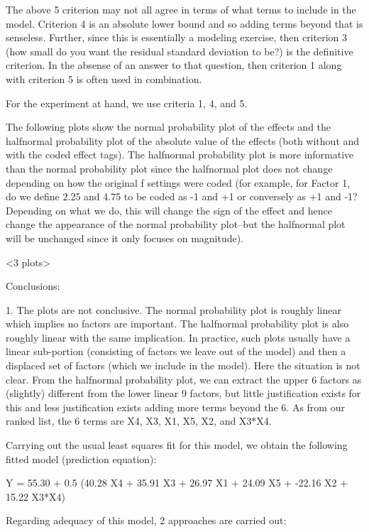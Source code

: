 The above 5 criterion may not all agree in terms of
what terms to include in the model.  Criterion 4 is an
absolute lower bound and so adding terms beyond that is
senseless.  Further, since this is essentially a
modeling exercise, then criterion 3 (how small do you
want the residual standard deviation to be?) is the
definitive criterion.  In the absense of an answer to
that question, then criterion 1 along with criterion 5
is often used in combination.

For the experiment at hand, we use criteria 1, 4, and 5.

The following plots show the normal probability plot of
the effects and the halfnormal probability plot of the
absolute value of the effects (both without and with
the coded effect tags).  The halfnormal probability
plot is more informative than the normal probability
plot since the halfnormal plot does not change
depending on how the original f settings were coded
(for example, for Factor 1, do we define 2.25 and 4.75
to be coded as -1 and +1 or conversely as +1 and -1?
Depending on what we do, this will change the sign of
the effect and hence change the appearance of the
normal probability plot--but the halfnormal plot will
be unchanged since it only focuses on magnitude).

<3 plots>

Conclusions:

1. The plots are not conclusive.  The normal
   probability plot is roughly linear which implies no
   factors are important.  The halfnormal probability
   plot is also roughly linear with the same
   implication.  In practice, such plots usually have a
   linear sub-portion (consisting of factors we leave
   out of the model) and then a displaced set of
   factors (which we include in the model).  Here the
   situation is not clear.  From the halfnormal
   probability plot, we can extract the upper 6 factors
   as (slightly) different from the lower linear 9
   factors, but little justification exists for this
   and less justification exists adding more terms
   beyond the 6. As from our ranked list, the 6 terms
   are X4, X3, X1, X5, X2, and X3*X4.

   Carrying out the usual least squares fit for this
   model, we obtain the following fitted model
   (prediction equation):

      Y = 55.30 + 0.5 (40.28 X4 + 35.91 X3 +
                       26.97 X1 + 24.09 X5 +
                      -22.16 X2 + 15.22 X3*X4)

   Regarding adequacy of this model, 2 approaches are
   carried out:

